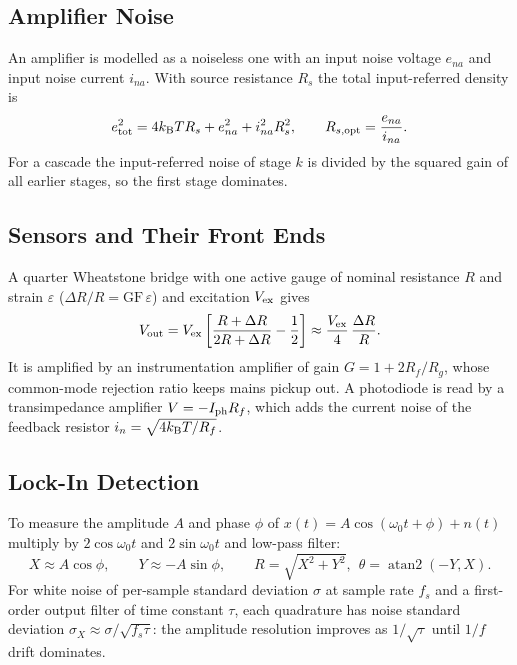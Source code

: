 \documentclass[11pt,a4paper]{article}
\begin{document}
\subsection{Amplifier Noise}
An amplifier is modelled as a noiseless one with an input noise voltage $e_{na}$ and input noise current $i_{na}$. With source resistance $R_s$ the total input-referred density is
\begin{equation}
  e_{\rm tot}^2=4k_{\mathrm B} TR_s+e_{na}^2+i_{na}^2R_s^2,\qquad R_{s,\rm opt}=\frac{e_{na}}{i_{na}}.
  \label{eq:amp}
\end{equation}
For a cascade the input-referred noise of stage $k$ is divided by the squared gain of all earlier stages, so the first stage dominates.

\subsection{Sensors and Their Front Ends}
A quarter Wheatstone bridge with one active gauge of nominal resistance $R$ and strain $\varepsilon$ ($\Delta R/R=\mathrm{GF}\,\varepsilon$) and excitation $V_{\rm ex}$ gives
\begin{equation}
  V_{\rm out}=V_{\rm ex}\left[\frac{R+\Delta R}{2R+\Delta R}-\frac12\right]\approx\frac{V_{\rm ex}}4\,\frac{\Delta R}{R}.
  \label{eq:bridge}
\end{equation}
It is amplified by an instrumentation amplifier of gain $G=1+2R_f/R_g$, whose common-mode rejection ratio keeps mains pickup out. A photodiode is read by a transimpedance amplifier $V=-I_{\rm ph}R_f$, which adds the current noise of the feedback resistor $i_n=\sqrt{4k_{\mathrm B} T/R_f}$.

\subsection{Lock-In Detection}
To measure the amplitude $A$ and phase $\phi$ of $x(t)=A\cos(\omega_0t+\phi)+n(t)$ multiply by $2\cos\omega_0t$ and $2\sin\omega_0t$ and low-pass filter:
\begin{equation}
  X\approx A\cos\phi,\qquad Y\approx-A\sin\phi,\qquad R=\sqrt{X^2+Y^2},\ \ \theta=\operatorname{atan2}(-Y,X).
  \label{eq:lockin}
\end{equation}
For white noise of per-sample standard deviation $\sigma$ at sample rate $f_s$ and a first-order output filter of time constant $\tau$, each quadrature has noise standard deviation $\sigma_X\approx\sigma/\sqrt{f_s\tau}$: the amplitude resolution improves as $1/\sqrt\tau$ until $1/f$ drift dominates.
\end{document}
